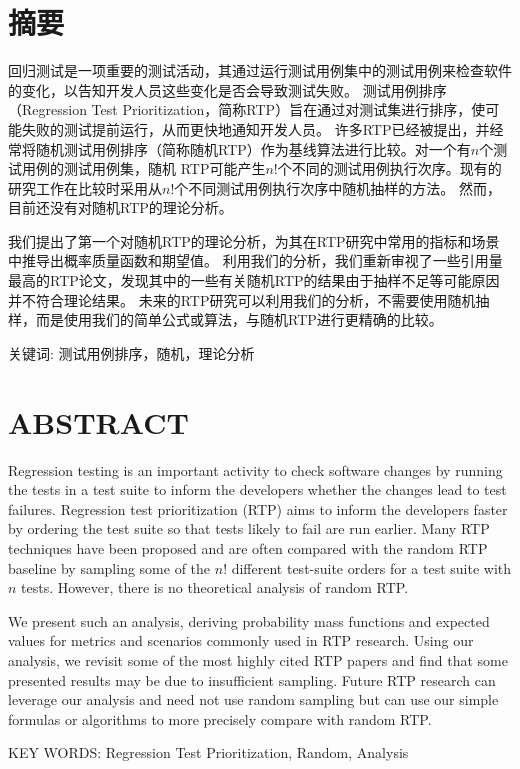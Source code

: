 \chapter*{\bfseries 摘要}

回归测试是一项重要的测试活动，其通过运行测试用例集中的测试用例来检查软件的变化，以告知开发人员这些变化是否会导致测试失败。
测试用例排序（Regression Test Prioritization，简称RTP）旨在通过对测试集进行排序，使可能失败的测试提前运行，从而更快地通知开发人员。
许多RTP已经被提出，并经常将随机测试用例排序（简称随机RTP）作为基线算法进行比较。对一个有$n$个测试用例的测试用例集，随机 RTP可能产生$n!$个不同的测试用例执行次序。现有的研究工作在比较时采用从$n!$个不同测试用例执行次序中随机抽样的方法。
然而，目前还没有对随机RTP的理论分析。

我们提出了第一个对随机RTP的理论分析，为其在RTP研究中常用的指标和场景中推导出概率质量函数和期望值。
利用我们的分析，我们重新审视了一些引用量最高的RTP论文，发现其中的一些有关随机RTP的结果由于抽样不足等可能原因并不符合理论结果。
未来的RTP研究可以利用我们的分析，不需要使用随机抽样，而是使用我们的简单公式或算法，与随机RTP进行更精确的比较。

\bigskip
\bigskip

关键词: 测试用例排序，随机，理论分析

\chapter*{\bfseries ABSTRACT}


Regression testing is an important activity to check software changes by running the tests in a test suite to inform the developers whether the changes lead to test failures.
Regression test prioritization (RTP) aims to inform the developers faster by ordering the test suite so that tests likely to fail are run earlier.
Many RTP techniques have been proposed and are often compared with the random RTP baseline by sampling some of the $n!$ different test-suite orders for a test suite with $n$ tests.
However, there is no theoretical analysis of random RTP. 

We present such an analysis, deriving probability mass functions and expected values for metrics and scenarios commonly used in RTP research.
Using our analysis, we revisit some of the most highly cited RTP papers and find that some presented results may be due to insufficient sampling.
Future RTP research can leverage our analysis and need not use random sampling but can use our simple formulas or algorithms to more precisely compare with random RTP.

\bigskip
\bigskip

KEY WORDS: Regression Test Prioritization, Random, Analysis
